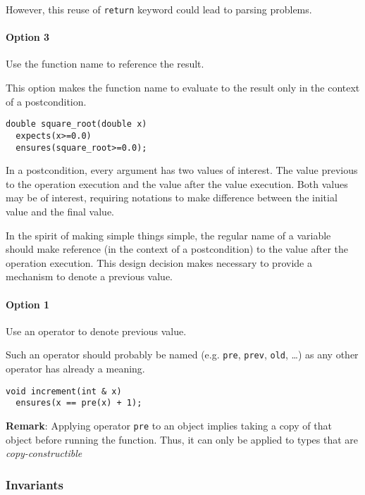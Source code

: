 However, this reuse of \texttt{return} keyword could lead to parsing problems.

\paragraph{Option 3} Use the function name to reference the result.

This option makes the function name to evaluate to the result only in the
context of a postcondition.

\begin{lstlisting}
double square_root(double x)
  expects(x>=0.0)
  ensures(square_root>=0.0);
\end{lstlisting}


In a postcondition, every argument has two values of interest. The value
previous to the operation execution and the value after the value execution.
Both values may be of interest, requiring notations to make difference between
the initial value and the final value.

In the spirit of making simple things simple, the regular name of a variable
should make reference (in the context of a postcondition) to the value after the
operation execution. This design decision makes necessary to provide a mechanism
to denote a previous value.

\paragraph{Option 1} Use an operator to denote previous value.

Such an operator should probably be named (e.g. \texttt{pre}, \texttt{prev},
\texttt{old}, \ldots) as any other operator has already a meaning.

\begin{lstlisting}
void increment(int & x)
  ensures(x == pre(x) + 1);
\end{lstlisting}

\textbf{Remark}: Applying operator \texttt{pre} to an object implies taking a
copy of that object before running the function. Thus, it can only be applied to
types that are \emph{copy-constructible}

\subsubsection{Invariants}

